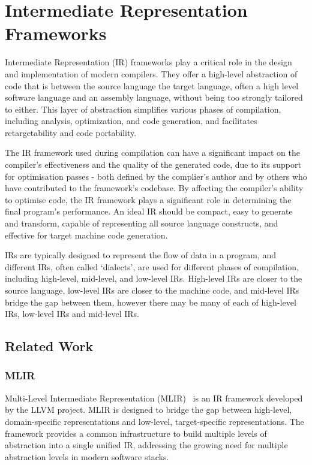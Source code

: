 \section{Intermediate Representation Frameworks}\label{irf}
Intermediate Representation (IR) frameworks play a critical role in the design and implementation of modern compilers. They offer a high-level abstraction of code that is between the source language the target language, often a high level software language and an assembly language, without being too strongly tailored to either. This layer of abstraction simplifies various phases of compilation, including analysis, optimization, and code generation, and facilitates retargetability and code portability.

The IR framework used during compilation can have a significant impact on the compiler's effectiveness and the quality of the generated code, due to its support for optimisation passes \hyphen{} both defined by the complier's author and by others who have contributed to the framework's codebase. By affecting the compiler's ability to optimise code, the IR framework plays a significant role in determining the final program's performance. An ideal IR should be compact, easy to generate and transform, capable of representing all source language constructs, and effective for target machine code generation.

IRs are typically designed to represent the flow of data in a program, and different IRs, often called `dialects', are used for different phases of compilation, including high-level, mid-level, and low-level IRs. High-level IRs are closer to the source language, low-level IRs are closer to the machine code, and mid-level IRs bridge the gap between them, however there may be many of each of high-level IRs, low-level IRs and mid-level IRs.

\subsection{Related Work}
\subsubsection{MLIR}
Multi-Level Intermediate Representation (MLIR) \cite{mlir} is an IR framework developed by the LLVM project. MLIR is designed to bridge the gap between high-level, domain-specific representations and low-level, target-specific representations. The framework provides a common infrastructure to build multiple levels of abstraction into a single unified IR, addressing the growing need for multiple abstraction levels in modern software stacks.

